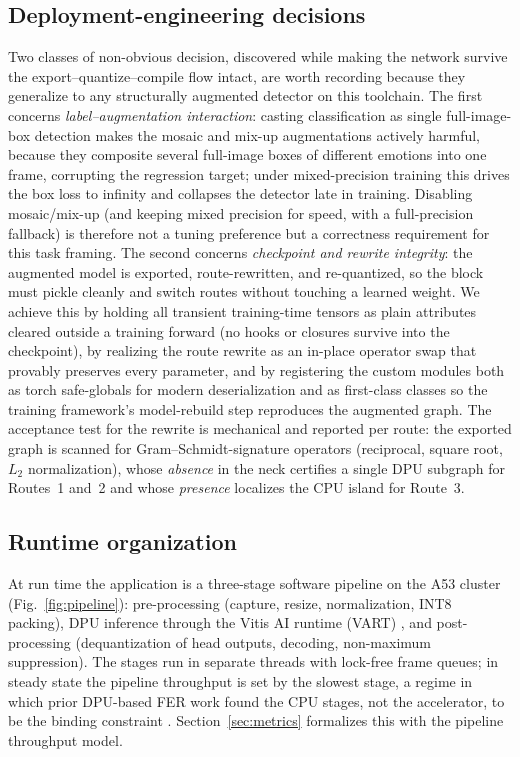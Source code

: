 \documentclass[onecolumn,journal]{IEEEtran}
\begin{document}
\subsection{Deployment-engineering decisions}\label{sec:engineering}
Two classes of non-obvious decision, discovered while making the network survive the
export--quantize--compile flow intact, are worth recording because they generalize to
any structurally augmented detector on this toolchain. The first concerns
\emph{label--augmentation interaction}: casting classification as single full-image-box
detection makes the mosaic and mix-up augmentations actively harmful, because they
composite several full-image boxes of different emotions into one frame, corrupting the
regression target; under mixed-precision training this drives the box loss to infinity
and collapses the detector late in training. Disabling mosaic/mix-up (and keeping
mixed precision for speed, with a full-precision fallback) is therefore not a tuning
preference but a correctness requirement for this task framing. The second concerns
\emph{checkpoint and rewrite integrity}: the augmented model is exported, route-rewritten,
and re-quantized, so the block must pickle cleanly and switch routes without touching a
learned weight. We achieve this by holding all transient training-time tensors as plain
attributes cleared outside a training forward (no hooks or closures survive into the
checkpoint), by realizing the route rewrite as an in-place operator swap that provably
preserves every parameter, and by registering the custom modules both as
torch safe-globals for modern deserialization and as first-class classes so the
training framework's model-rebuild step reproduces the augmented graph. The acceptance
test for the rewrite is mechanical and reported per route: the exported graph is scanned
for Gram--Schmidt-signature operators (reciprocal, square root, $L_2$ normalization),
whose \emph{absence} in the neck certifies a single DPU subgraph for Routes~1 and~2 and
whose \emph{presence} localizes the CPU island for Route~3.

\subsection{Runtime organization}\label{sec:runtime}
At run time the application is a three-stage software pipeline on the A53 cluster
(Fig.~\ref{fig:pipeline}): pre-processing (capture, resize, normalization, INT8
packing), DPU inference through the Vitis AI runtime (VART) \cite{amd_ug1414}, and
post-processing (dequantization of head outputs, decoding, non-maximum suppression).
The stages run in separate threads with lock-free frame queues; in steady state the
pipeline throughput is set by the slowest stage, a regime in which prior DPU-based FER
work found the CPU stages, not the accelerator, to be the binding constraint
\cite{ando2025fer}. Section~\ref{sec:metrics} formalizes this with the pipeline
throughput model.
\end{document}
